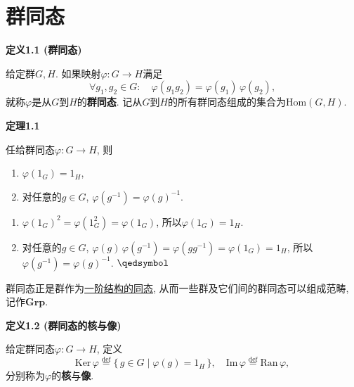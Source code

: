 \documentclass[UTF8]{ctexart}
\begin{document}
\setlength{\abovedisplayskip}{1pt}
\setlength{\belowdisplayskip}{1pt}

\section{群同态}

\hypertarget{sec:定义1.1}{}
\noindent\textbf{定义1.1 (群同态)}

给定群$G,H$. 如果映射$\varphi:G\to H$满足
\[
    \forall g_1,g_2\in G:\quad\varphi(g_1g_2)=\varphi(g_1)\,\varphi(g_2),
\]
就称$\varphi$是从$G$到$H$的\textbf{群同态}.
记从$G$到$H$的所有群同态组成的集合为$\mathrm{Hom}(G,H)$.

\vspace{10pt}

\hypertarget{sec:定理1.1}{}
\noindent\textbf{定理1.1}

任给群同态$\varphi:G\to H$, 则
\begin{enumerate}
    \item $\varphi(1_G)=1_H$,
    \item 对任意的$g\in G$, $\varphi(g^{-1})=\varphi(g)^{-1}$.
\end{enumerate}


\begin{enumerate}
    \item $\varphi(1_G)^2=\varphi(1_G^2)=\varphi(1_G)$, 所以$\varphi(1_G)=1_H$.
    \item 对任意的$g\in G$, $\varphi(g)\,\varphi(g^{-1})=\varphi(gg^{-1})
    =\varphi(1_G)=1_H$, 所以$\varphi(g^{-1})=\varphi(g)^{-1}$. \hfill $\qedsymbol$
\end{enumerate}

\vspace{10pt}

群同态正是群作为\href{../../../06 数理逻辑/02 模型论/01 一阶语言的结构/02 结构的同态#nameddest=sec:定义1.1}
{一阶结构的同态}, 从而一些群及它们间的群同态可以组成范畴, 记作$\mathbf{Grp}$.

\vspace{10pt}

\hypertarget{sec:定义1.2}{}
\noindent\textbf{定义1.2 (群同态的核与像)}

给定群同态$\varphi:G\to H$, 定义
\[
    \mathrm{Ker}\,\varphi\overset{\mathrm{def}}{=}\{\,g\in G\mid\varphi(g)=1_H\,\},
    \quad\mathrm{Im}\,\varphi\overset{\mathrm{def}}{=}\mathrm{Ran}\,\varphi,
\]
分别称为$\varphi$的\textbf{核}与\textbf{像}.

\vspace{10pt}
\end{document}
